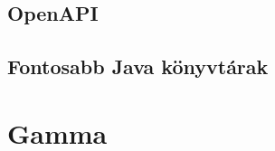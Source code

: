 \subsection{OpenAPI}
\cite{swagger}
\subsection{Fontosabb Java könyvtárak}

\section{Gamma}









